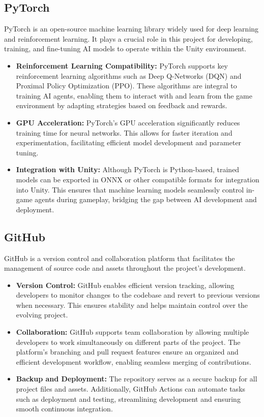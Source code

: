 \documentclass[12pt,oneside,openright,a4paper]{cpe-english-project}
\begin{document}
\subsection{PyTorch}
PyTorch is an open-source machine learning library widely used for deep learning and reinforcement learning. It plays a crucial role in this project for developing, training, and fine-tuning AI models to operate within the Unity environment.
\begin{itemize}
\item  \textbf{Reinforcement Learning Compatibility:}
PyTorch supports key reinforcement learning algorithms such as Deep Q-Networks (DQN) and Proximal Policy Optimization (PPO). These algorithms are integral to training AI agents, enabling them to interact with and learn from the game environment by adapting strategies based on feedback and rewards.
\item  \textbf{GPU Acceleration:}
PyTorch’s GPU acceleration significantly reduces training time for neural networks. This allows for faster iteration and experimentation, facilitating efficient model development and parameter tuning.
\item  \textbf{Integration with Unity:}
Although PyTorch is Python-based, trained models can be exported in ONNX or other compatible formats for integration into Unity. This ensures that machine learning models seamlessly control in-game agents during gameplay, bridging the gap between AI development and deployment.
\end{itemize}

\subsection{GitHub}
GitHub is a version control and collaboration platform that facilitates the management of source code and assets throughout the project's development.
\begin{itemize}
\item  \textbf{Version Control:}
GitHub enables efficient version tracking, allowing developers to monitor changes to the codebase and revert to previous versions when necessary. This ensures stability and helps maintain control over the evolving project.
\item  \textbf{Collaboration:}
GitHub supports team collaboration by allowing multiple developers to work simultaneously on different parts of the project. The platform's branching and pull request features ensure an organized and efficient development workflow, enabling seamless merging of contributions.
\item  \textbf{Backup and Deployment:} 
The repository serves as a secure backup for all project files and assets. Additionally, GitHub Actions can automate tasks such as deployment and testing, streamlining development and ensuring smooth continuous integration.
\end{itemize}
\end{document}
